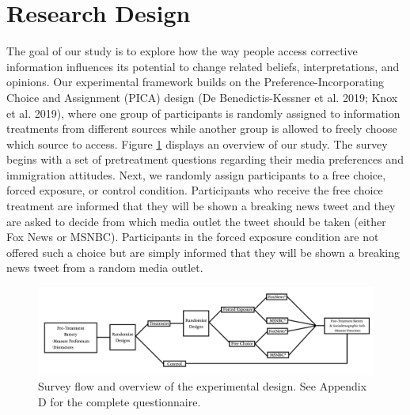 \documentclass[
  12pt,
]{article}
\begin{document}
\hypertarget{research-design}{%
\section{Research Design}\label{research-design}}

The goal of our study is to explore how the way people access corrective
information influences its potential to change related beliefs,
interpretations, and opinions. Our experimental framework builds on the
Preference-Incorporating Choice and Assignment (PICA) design (De
Benedictis-Kessner et al. 2019; Knox et al. 2019), where one group of
participants is randomly assigned to information treatments from
different sources while another group is allowed to freely choose which
source to access. Figure \ref{fig:flow} displays an overview of our
study. The survey begins with a set of pretreatment questions regarding
their media preferences and immigration attitudes. Next, we randomly
assign participants to a free choice, forced exposure, or control
condition. Participants who receive the free choice treatment are
informed that they will be shown a breaking news tweet and they are
asked to decide from which media outlet the tweet should be taken
(either Fox News or MSNBC). Participants in the forced exposure
condition are not offered such a choice but are simply informed that
they will be shown a breaking news tweet from a random media outlet.

\singlespace

\begin{figure}
\centering
\includegraphics{../prereg/Lab-Graphic.jpg}
\caption{\label{fig:flow}Survey flow and overview of the experimental
design. See Appendix D for the complete questionnaire.}
\end{figure}

\doublespacing
\end{document}
